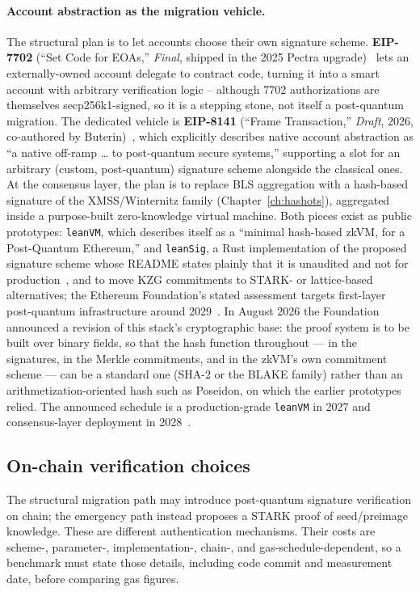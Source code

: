 \paragraph{Account abstraction as the migration vehicle.}
The structural plan is to let accounts choose their own signature scheme. \textbf{EIP-7702} (``Set Code for EOAs,'' \emph{Final}, shipped in the 2025 Pectra upgrade)~\cite{eip7702} lets an externally-owned account delegate to contract code, turning it into a smart account with arbitrary verification logic -- although 7702 authorizations are themselves secp256k1-signed, so it is a stepping stone, not itself a post-quantum migration. The dedicated vehicle is \textbf{EIP-8141} (``Frame Transaction,'' \emph{Draft}, 2026, co-authored by Buterin)~\cite{eip8141}, which explicitly describes native account abstraction as ``a native off-ramp \dots{} to post-quantum secure systems,'' supporting a slot for an arbitrary (custom, post-quantum) signature scheme alongside the classical ones. At the consensus layer, the plan is to replace BLS aggregation with a hash-based signature of the XMSS/Winternitz family (Chapter~\ref{ch:hashots}), aggregated inside a purpose-built zero-knowledge virtual machine. Both pieces exist as public prototypes: \texttt{leanVM}, which describes itself as a ``minimal hash-based zkVM, for a Post-Quantum Ethereum,'' and \texttt{leanSig}, a Rust implementation of the proposed signature scheme whose README states plainly that it is unaudited and not for production~\cite{leanvm}, and to move KZG commitments to STARK- or lattice-based alternatives; the Ethereum Foundation's stated assessment targets first-layer post-quantum infrastructure around 2029~\cite{ethpqroadmap}. In August 2026 the Foundation announced a revision of this stack's cryptographic base: the proof system is to be built over binary fields, so that the hash function throughout --- in the signatures, in the Merkle commitments, and in the zkVM's own commitment scheme --- can be a standard one (SHA-2 or the BLAKE family) rather than an arithmetization-oriented hash such as Poseidon, on which the earlier prototypes relied. The announced schedule is a production-grade \texttt{leanVM} in 2027 and consensus-layer deployment in 2028~\cite{efbinary2026}.

\subsection{On-chain verification choices}
\label{sec:onchain}
The structural migration path may introduce post-quantum signature verification on
chain; the emergency path instead proposes a STARK proof of seed/preimage knowledge.
These are different authentication mechanisms. Their costs are scheme-, parameter-,
implementation-, chain-, and gas-schedule-dependent, so a benchmark must state those
details, including code commit and measurement date, before comparing gas figures.

